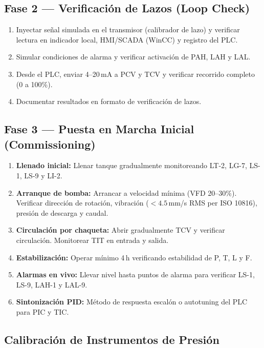 \documentclass[12pt,letterpaper]{article}
\begin{document}
\subsection{Fase 2 — Verificación de Lazos (Loop Check)}

\begin{enumerate}[leftmargin=1.5cm, label=\arabic*.]
  \item Inyectar señal simulada en el transmisor (calibrador de lazo) y verificar lectura en indicador local, HMI/SCADA (WinCC) y registro del PLC.
  \item Simular condiciones de alarma y verificar activación de PAH, LAH y LAL.
  \item Desde el PLC, enviar 4--20\,mA a PCV y TCV y verificar recorrido completo (0 a 100\%).
  \item Documentar resultados en formato de verificación de lazos.
\end{enumerate}

\subsection{Fase 3 — Puesta en Marcha Inicial (Commissioning)}

\begin{enumerate}[leftmargin=1.5cm, label=\arabic*.]
  \item \textbf{Llenado inicial:} Llenar tanque gradualmente monitoreando LT-2, LG-7, LS-1, LS-9 y LI-2.
  \item \textbf{Arranque de bomba:} Arrancar a velocidad mínima (VFD 20--30\%). Verificar dirección de rotación, vibración ($<4.5\,$mm/s RMS per ISO 10816), presión de descarga y caudal.
  \item \textbf{Circulación por chaqueta:} Abrir gradualmente TCV y verificar circulación. Monitorear TIT en entrada y salida.
  \item \textbf{Estabilización:} Operar mínimo 4\,h verificando estabilidad de P, T, L y F.
  \item \textbf{Alarmas en vivo:} Llevar nivel hasta puntos de alarma para verificar LS-1, LS-9, LAH-1 y LAL-9.
  \item \textbf{Sintonización PID:} Método de respuesta escalón o autotuning del PLC para PIC y TIC.
\end{enumerate}

\subsection{Calibración de Instrumentos de Presión}
\end{document}
